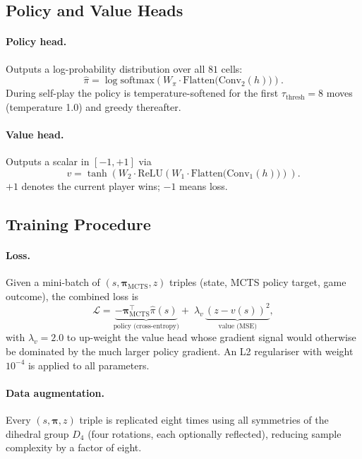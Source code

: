 \documentclass[11pt,a4paper]{article}
\begin{document}
\subsection{Policy and Value Heads}

\paragraph{Policy head.}
Outputs a log-probability distribution over all $81$ cells:
\begin{equation}
  \hat{\pi} = \log\mathrm{softmax}\!\left(W_\pi \cdot
               \mathrm{Flatten}\bigl(\mathrm{Conv}_{2}(h)\bigr)\right).
\end{equation}
During self-play the policy is temperature-softened for the first
$\tau_\text{thresh}=8$ moves (temperature 1.0) and greedy thereafter.

\paragraph{Value head.}
Outputs a scalar in $[-1,+1]$ via
\begin{equation}
  v = \tanh\!\left(W_2 \cdot \mathrm{ReLU}\!\left(W_1 \cdot
      \mathrm{Flatten}\bigl(\mathrm{Conv}_{1}(h)\bigr)\right)\right).
\end{equation}
$+1$ denotes the current player wins; $-1$ means loss.

\subsection{Training Procedure}

\paragraph{Loss.}
Given a mini-batch of $(s, \boldsymbol{\pi}_\text{MCTS}, z)$ triples (state,
MCTS policy target, game outcome), the combined loss is
\begin{equation}
  \label{eq:loss}
  \mathcal{L} = \underbrace{-\boldsymbol{\pi}_\text{MCTS}^\top \hat{\pi}(s)}_{\text{policy (cross-entropy)}}
              + \;\lambda_v\,\underbrace{(z - v(s))^2}_{\text{value (MSE)}},
\end{equation}
with $\lambda_v = 2.0$ to up-weight the value head whose gradient signal would
otherwise be dominated by the much larger policy gradient.  An L2 regulariser
with weight $10^{-4}$ is applied to all parameters.

\paragraph{Data augmentation.}
Every $(s, \boldsymbol{\pi}, z)$ triple is replicated eight times using all
symmetries of the dihedral group $D_4$ (four rotations, each optionally
reflected), reducing sample complexity by a factor of eight.
\end{document}
